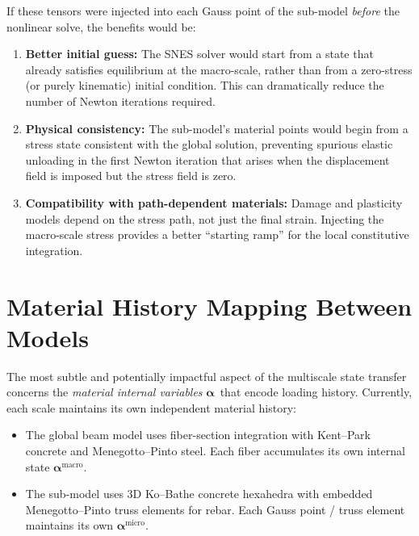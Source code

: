 If these tensors were injected into each Gauss point of the sub-model
\emph{before} the nonlinear solve, the benefits would be:

\begin{enumerate}
  \item \textbf{Better initial guess:}  The SNES solver would start
    from a state that already satisfies equilibrium at the macro-scale,
    rather than from a zero-stress (or purely kinematic) initial
    condition.  This can dramatically reduce the number of Newton
    iterations required.

  \item \textbf{Physical consistency:}  The sub-model's material
    points would begin from a stress state consistent with the
    global solution, preventing spurious elastic unloading in the
    first Newton iteration that arises when the displacement field
    is imposed but the stress field is zero.

  \item \textbf{Compatibility with path-dependent materials:}
    Damage and plasticity models depend on the stress path, not just
    the final strain.  Injecting the macro-scale stress provides
    a better ``starting ramp'' for the local constitutive integration.
\end{enumerate}


\section{Material History Mapping Between Models}
\label{sec:material-history-mapping}

The most subtle and potentially impactful aspect of the multiscale
state transfer concerns the \emph{material internal variables}
$\boldsymbol{\alpha}$~that encode loading history.  Currently, each
scale maintains its own independent material history:

\begin{itemize}
  \item The global beam model uses fiber-section integration with
    Kent--Park concrete and Menegotto--Pinto steel.  Each fiber
    accumulates its own internal state
    $\boldsymbol{\alpha}^{\text{macro}}$.
  \item The sub-model uses 3D Ko--Bathe concrete hexahedra with
    embedded Menegotto--Pinto truss elements for rebar.  Each Gauss
    point / truss element maintains its own
    $\boldsymbol{\alpha}^{\text{micro}}$.
\end{itemize}

